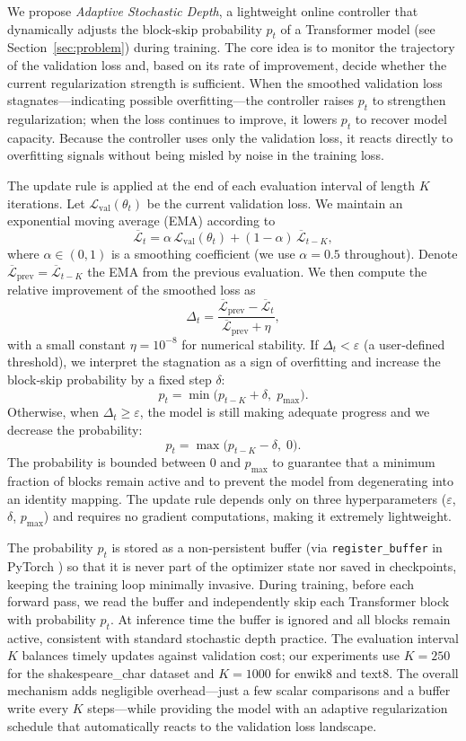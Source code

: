 \documentclass{article} %
\begin{document}
We propose \textit{Adaptive Stochastic Depth}, a lightweight online controller that dynamically adjusts the block‑skip probability \(p_t\) of a Transformer model (see Section~\ref{sec:problem}) during training. The core idea is to monitor the trajectory of the validation loss and, based on its rate of improvement, decide whether the current regularization strength is sufficient. When the smoothed validation loss stagnates—indicating possible overfitting—the controller raises \(p_t\) to strengthen regularization; when the loss continues to improve, it lowers \(p_t\) to recover model capacity. Because the controller uses only the validation loss, it reacts directly to overfitting signals without being misled by noise in the training loss.

The update rule is applied at the end of each evaluation interval of length \(K\) iterations. Let \(\mathcal{L}_{\text{val}}(\theta_t)\) be the current validation loss. We maintain an exponential moving average (EMA) according to
\[
\overline{\mathcal{L}}_t = \alpha\,\mathcal{L}_{\text{val}}(\theta_t) + (1-\alpha)\,\overline{\mathcal{L}}_{t-K},
\]
where \(\alpha\in(0,1)\) is a smoothing coefficient (we use \(\alpha=0.5\) throughout). Denote \(\overline{\mathcal{L}}_{\text{prev}} = \overline{\mathcal{L}}_{t-K}\) the EMA from the previous evaluation. We then compute the relative improvement of the smoothed loss as
\[
\Delta_t = \frac{\overline{\mathcal{L}}_{\text{prev}} - \overline{\mathcal{L}}_t}{\overline{\mathcal{L}}_{\text{prev}} + \eta},
\]
with a small constant \(\eta = 10^{-8}\) for numerical stability. If \(\Delta_t < \varepsilon\) (a user‑defined threshold), we interpret the stagnation as a sign of overfitting and increase the block‑skip probability by a fixed step \(\delta\):
\[
p_t = \min\!\big(p_{t-K} + \delta,\; p_{\max}\big).
\]
Otherwise, when \(\Delta_t \ge \varepsilon\), the model is still making adequate progress and we decrease the probability:
\[
p_t = \max\!\big(p_{t-K} - \delta,\; 0\big).
\]
The probability is bounded between \(0\) and \(p_{\max}\) to guarantee that a minimum fraction of blocks remain active and to prevent the model from degenerating into an identity mapping. The update rule depends only on three hyperparameters (\(\varepsilon\), \(\delta\), \(p_{\max}\)) and requires no gradient computations, making it extremely lightweight.

The probability \(p_t\) is stored as a non‑persistent buffer (via \texttt{register\_buffer} in PyTorch \citep{paszke2019pytorch}) so that it is never part of the optimizer state nor saved in checkpoints, keeping the training loop minimally invasive. During training, before each forward pass, we read the buffer and independently skip each Transformer block with probability \(p_t\). At inference time the buffer is ignored and all blocks remain active, consistent with standard stochastic depth practice. The evaluation interval \(K\) balances timely updates against validation cost; our experiments use \(K=250\) for the shakespeare\_char dataset and \(K=1000\) for enwik8 and text8. The overall mechanism adds negligible overhead—just a few scalar comparisons and a buffer write every \(K\) steps—while providing the model with an adaptive regularization schedule that automatically reacts to the validation loss landscape.
\end{document}
